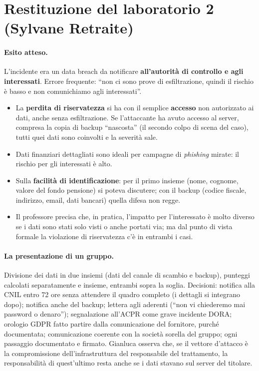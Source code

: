 \section{Restituzione del laboratorio 2 (Sylvane Retraite)}

\paragraph{Esito atteso.} L'incidente era un data breach da notificare \textbf{all'autorità di controllo e
agli interessati}. Errore frequente: ``non ci sono prove di esfiltrazione, quindi il rischio è basso e non
comunichiamo agli interessati''.
\begin{itemize}
  \item La \textbf{perdita di riservatezza} si ha con il semplice \textbf{accesso} non autorizzato ai dati,
    anche senza esfiltrazione. Se l'attaccante ha avuto accesso al server, compresa la copia di backup
    ``nascosta'' (il secondo colpo di scena del caso), tutti quei dati sono coinvolti e la severità sale.
  \item Dati finanziari dettagliati sono ideali per campagne di \emph{phishing} mirate: il rischio per gli
    interessati è alto.
  \item Sulla \textbf{facilità di identificazione}: per il primo insieme (nome, cognome, valore del fondo
    pensione) si poteva discutere; con il backup (codice fiscale, indirizzo, email, dati bancari) quella
    difesa non regge.
  \item Il professore precisa che, in pratica, l'impatto per l'interessato è molto diverso se i dati sono
    stati solo visti o anche portati via; ma dal punto di vista formale la violazione di riservatezza c'è
    in entrambi i casi.
\end{itemize}

\paragraph{La presentazione di un gruppo.} Divisione dei dati in due insiemi (dati del canale di scambio e
backup), punteggi calcolati separatamente e insieme, entrambi sopra la soglia. Decisioni: notifica alla
CNIL entro 72 ore senza attendere il quadro completo (i dettagli si integrano dopo); notifica anche del
backup; lettera agli aderenti (``non vi chiederemo mai password o denaro''); segnalazione all'ACPR come
grave incidente DORA; orologio GDPR fatto partire dalla comunicazione del fornitore, purché documentata;
comunicazione coerente con la società sorella del gruppo; ogni passaggio documentato e firmato. Gianluca
osserva che, se il vettore d'attacco è la compromissione dell'infrastruttura del responsabile del
trattamento, la responsabilità di quest'ultimo resta anche se i dati stavano sul server del titolare.

